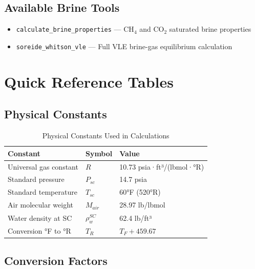 \documentclass[11pt,a4paper]{article}
\begin{document}
\subsection{Available Brine Tools}
\begin{itemize}
\item \texttt{calculate\_brine\_properties} --- CH$_4$ and CO$_2$ saturated brine properties
\item \texttt{soreide\_whitson\_vle} --- Full VLE brine-gas equilibrium calculation
\end{itemize}

\newpage

\section{Quick Reference Tables}

\subsection{Physical Constants}

\begin{table}[h]
\centering
\begin{tabular}{lll}
\toprule
\textbf{Constant} & \textbf{Symbol} & \textbf{Value} \\
\midrule
Universal gas constant & $R$ & 10.73 psia·ft³/(lbmol·°R) \\
Standard pressure & $P_{sc}$ & 14.7 psia \\
Standard temperature & $T_{sc}$ & 60°F (520°R) \\
Air molecular weight & $M_{air}$ & 28.97 lb/lbmol \\
Water density at SC & $\rho_w^{SC}$ & 62.4 lb/ft³ \\
Conversion °F to °R & $T_R$ & $T_F + 459.67$ \\
\bottomrule
\end{tabular}
\caption{Physical Constants Used in Calculations}
\end{table}

\subsection{Conversion Factors}
\end{document}
